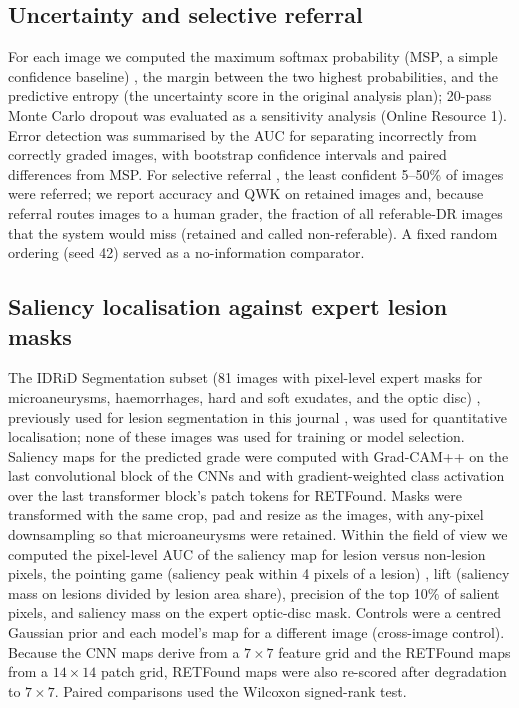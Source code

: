 \documentclass[pdflatex,sn-basic,Numbered]{sn-jnl}
\begin{document}
\subsection{Uncertainty and selective referral}

For each image we computed the maximum softmax probability (MSP, a simple confidence baseline) \cite{hendrycks2017baseline}, the margin between the two highest probabilities, and the predictive entropy (the uncertainty score in the original analysis plan); 20-pass Monte Carlo dropout \cite{gal2016dropout} was evaluated as a sensitivity analysis (Online Resource 1). Error detection was summarised by the AUC for separating incorrectly from correctly graded images, with bootstrap confidence intervals and paired differences from MSP. For selective referral \cite{geifman2017selective}, the least confident 5--50\% of images were referred; we report accuracy and QWK on retained images and, because referral routes images to a human grader, the fraction of all referable-DR images that the system would miss (retained and called non-referable). A fixed random ordering (seed 42) served as a no-information comparator.

\subsection{Saliency localisation against expert lesion masks}

The IDRiD Segmentation subset (81 images with pixel-level expert masks for microaneurysms, haemorrhages, hard and soft exudates, and the optic disc) \cite{porwal2018}, previously used for lesion segmentation in this journal \cite{yuan2023}, was used for quantitative localisation; none of these images was used for training or model selection. Saliency maps for the predicted grade were computed with Grad-CAM++ \cite{chattopadhay2018gradcampp} on the last convolutional block of the CNNs and with gradient-weighted class activation over the last transformer block's patch tokens for RETFound. Masks were transformed with the same crop, pad and resize as the images, with any-pixel downsampling so that microaneurysms were retained. Within the field of view we computed the pixel-level AUC of the saliency map for lesion versus non-lesion pixels, the pointing game (saliency peak within 4 pixels of a lesion) \cite{zhang2018topdown}, lift (saliency mass on lesions divided by lesion area share), precision of the top 10\% of salient pixels, and saliency mass on the expert optic-disc mask. Controls were a centred Gaussian prior and each model's map for a different image (cross-image control). Because the CNN maps derive from a $7\times7$ feature grid and the RETFound maps from a $14\times14$ patch grid, RETFound maps were also re-scored after degradation to $7\times7$. Paired comparisons used the Wilcoxon signed-rank test.
\end{document}
